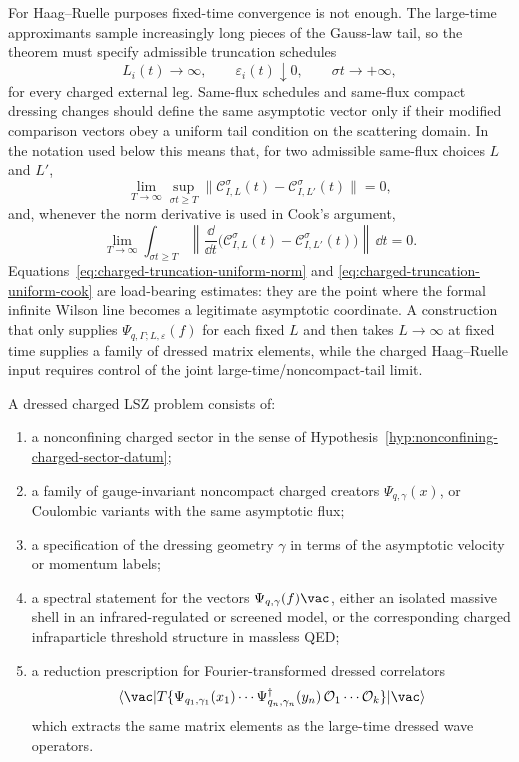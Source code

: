 For Haag--Ruelle purposes fixed-time convergence is not enough.  The
large-time approximants sample increasingly long pieces of the Gauss-law tail,
so the theorem must specify admissible truncation schedules
\[
  L_i(t)\to\infty,\qquad \varepsilon_i(t)\downarrow0 ,
  \qquad \sigma t\to+\infty ,
\]
for every charged external leg.  Same-flux schedules and same-flux compact
dressing changes should define the same asymptotic vector only if their
modified comparison vectors obey a uniform tail condition on the scattering
domain.  In the notation used below this means that, for two admissible
same-flux choices \(L\) and \(L'\),
\begin{equation}
  \lim_{T\to\infty}\sup_{\sigma t\ge T}
  \bigl\|
    \mathcal C_{I,L}^{\sigma}(t)
    -
    \mathcal C_{I,L'}^{\sigma}(t)
  \bigr\|=0,
  \label{eq:charged-truncation-uniform-norm}
\end{equation}
and, whenever the norm derivative is used in Cook's argument,
\begin{equation}
  \lim_{T\to\infty}
  \int_{\sigma t\ge T}
  \left\|
    \frac{\dd}{\dd t}
    \bigl(
      \mathcal C_{I,L}^{\sigma}(t)
      -
      \mathcal C_{I,L'}^{\sigma}(t)
    \bigr)
  \right\|\,\dd t
  =0 .
  \label{eq:charged-truncation-uniform-cook}
\end{equation}
Equations~\eqref{eq:charged-truncation-uniform-norm} and
\eqref{eq:charged-truncation-uniform-cook} are load-bearing estimates: they
are the point where the formal infinite Wilson line becomes a legitimate
asymptotic coordinate.  A construction that only supplies
\(\Psi_{q,\Gamma;L,\varepsilon}(f)\) for each fixed \(L\) and then takes
\(L\to\infty\) at fixed time supplies a family of dressed matrix elements,
while the charged Haag--Ruelle input requires control of the joint
large-time/noncompact-tail limit.

\begin{definition}
\label{def:dressed-charged-lsz-problem}
A dressed charged LSZ problem consists of:
\begin{enumerate}
\item a nonconfining charged sector in the sense of
Hypothesis~\ref{hyp:nonconfining-charged-sector-datum};
\item a family of gauge-invariant noncompact charged creators
\(\Psi_{q,\gamma}(x)\), or Coulombic variants with the same asymptotic flux;
\item a specification of the dressing geometry \(\gamma\) in terms of the
asymptotic velocity or momentum labels;
\item a spectral statement for the vectors \(\Psi_{q,\gamma}(f)\vac\), either
an isolated massive shell in an infrared-regulated or screened model, or the
corresponding charged infraparticle threshold structure in massless QED;
\item a reduction prescription for Fourier-transformed dressed correlators
\[
  \langle\vac|
  T\{\Psi_{q_1,\gamma_1}(x_1)\cdots
      \Psi^\dagger_{q_n,\gamma_n}(y_n)\,\mathcal O_1\cdots\mathcal O_k\}
  |\vac\rangle
\]
which extracts the same matrix elements as the large-time dressed wave
operators.
\end{enumerate}
\end{definition}


